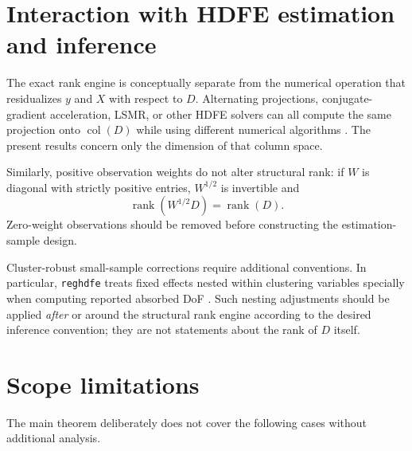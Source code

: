 \documentclass[11pt]{article}
\theoremstyle{definition}
\newcommand{\rank}{\operatorname{rank}}
\newcommand{\col}{\operatorname{col}}
\newcommand{\1}{\mathbf{1}}
\begin{document}
\section{Interaction with HDFE estimation and inference}

The exact rank engine is conceptually separate from the numerical operation that residualizes $y$ and $X$ with respect to $D$. Alternating projections, conjugate-gradient acceleration, LSMR, or other HDFE solvers can all compute the same projection onto $\col(D)$ while using different numerical algorithms \citep{GuimaraesPortugal2010,Gaure2013,Correia2017}. The present results concern only the dimension of that column space.

Similarly, positive observation weights do not alter structural rank: if $W$ is diagonal with strictly positive entries, $W^{1/2}$ is invertible and
\begin{equation}
  \rank(W^{1/2}D)=\rank(D).
\end{equation}
Zero-weight observations should be removed before constructing the estimation-sample design.

Cluster-robust small-sample corrections require additional conventions. In particular, \texttt{reghdfe} treats fixed effects nested within clustering variables specially when computing reported absorbed DoF \citep{CorreiaConstantine2026reghdfe}. Such nesting adjustments should be applied \emph{after} or around the structural rank engine according to the desired inference convention; they are not statements about the rank of $D$ itself.

\section{Scope limitations}

The main theorem deliberately does not cover the following cases without additional analysis.
\end{document}
